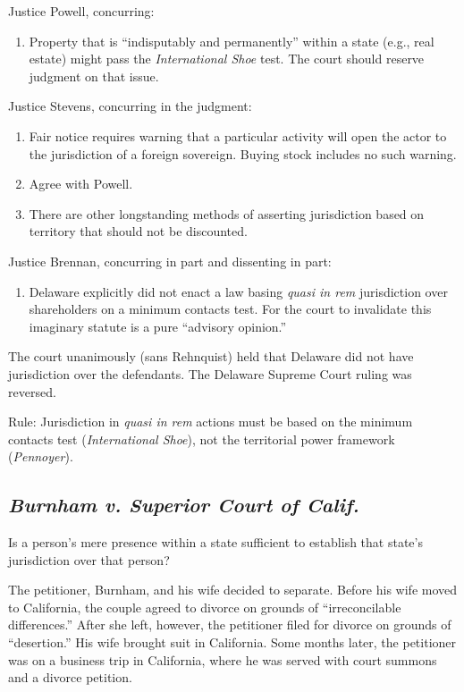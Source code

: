 Justice Powell, concurring:

\begin{enumerate}
\item
  Property that is ``indisputably and permanently'' within a state
  (e.g., real estate) might pass the \emph{International Shoe} test. The
  court should reserve judgment on that issue.
\end{enumerate}

Justice Stevens, concurring in the judgment:

\begin{enumerate}
\item
  Fair notice requires warning that a particular activity will open the
  actor to the jurisdiction of a foreign sovereign. Buying stock
  includes no such warning.
\item
  Agree with Powell.
\item
  There are other longstanding methods of asserting jurisdiction based
  on territory that should not be discounted.
\end{enumerate}

Justice Brennan, concurring in part and dissenting in part:

\begin{enumerate}
\item
  Delaware explicitly did not enact a law basing \emph{quasi in rem}
  jurisdiction over shareholders on a minimum contacts test. For the
  court to invalidate this imaginary statute is a pure ``advisory
  opinion.''
\end{enumerate}

The court unanimously (sans Rehnquist) held that Delaware did not have
jurisdiction over the defendants. The Delaware Supreme Court ruling was
reversed.

Rule: Jurisdiction in \emph{quasi in rem} actions must be based on the minimum
contacts test (\emph{International Shoe}), not the territorial power
framework (\emph{Pennoyer}).

\subsection{\emph{Burnham v. Superior Court of Calif.}}

Is a person's mere presence within a state sufficient to establish that
state's jurisdiction over that person?

The petitioner, Burnham, and his wife decided to separate. Before his
wife moved to California, the couple agreed to divorce on grounds of
``irreconcilable differences.'' After she left, however, the petitioner
filed for divorce on grounds of ``desertion.'' His wife brought suit in
California. Some months later, the petitioner was on a business trip in
California, where he was served with court summons and a divorce
petition.

